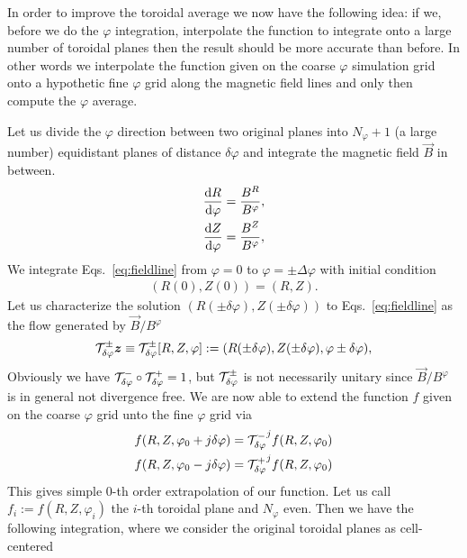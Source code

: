In order to improve the toroidal average we now have the following idea:
if we, before we do the $\varphi$ integration,
interpolate the function to integrate onto a large number of toroidal
planes then the result should
be more accurate than before.
In other words we interpolate the function given on the coarse $\varphi$ simulation grid
onto a hypothetic fine $\varphi$ grid along the magnetic field lines
and only then compute the $\varphi$ average.

Let us divide the $\varphi$ direction between two original planes into $N_\varphi+1$ (a large number) equidistant planes
of distance $\delta \varphi$ and integrate the magnetic field $\vec B$ in between.
\begin{subequations}
\begin{align}
    \frac{\d R}{\d\varphi}&= \frac{B^R}{B^\varphi},\\ %
    \frac{\d Z}{\d\varphi}&=\frac{B^Z}{B^\varphi},\\%
\end{align}
\label{eq:fieldline}
\end{subequations}
We integrate Eqs.~\eqref{eq:fieldline} from $\varphi=0$ to $\varphi=\pm \Delta \varphi$
with initial condition
\begin{align}
    (R(0), Z(0) ) = (R, Z).
    \label{}
\end{align}
Let us characterize the solution $(R(\pm \delta \varphi), Z(\pm \delta \varphi))$ to Eqs.~\eqref{eq:fieldline} as the flow generated by $\vec B/B^\varphi$
\begin{align}
    \mathcal T^\pm_{\delta\varphi}{\boldsymbol{z}} \equiv \mathcal T^\pm_{\delta\varphi}[R, Z, \varphi]:= ( R(\pm \delta\varphi), Z( \pm \delta\varphi), \varphi\pm\delta \varphi),
    \label{}
\end{align}
Obviously we have $\mathcal T^-_{\delta\varphi}\circ\mathcal T^+_{\delta\varphi} = 1$, but $\mathcal T^\pm_{\delta\varphi}$ is not necessarily unitary since $\vec B/B^\varphi$ is in general
not divergence free.
We are now able to extend the function $f$ given on the coarse $\varphi$ grid unto the fine $\varphi$ grid via
\begin{align}
    f(R,Z,\varphi_0+j\delta\varphi) = {\mathcal T^-_{\delta\varphi}}^j f(R,Z,\varphi_0)\\
    f(R,Z,\varphi_0-j\delta \varphi) = {\mathcal T^+_{\delta\varphi}}^j f(R,Z,\varphi_0)
\end{align}
This gives simple 0-th order extrapolation of our function.
Let us call $f_i := f(R,Z,\varphi_i)$ the $i$-th toroidal plane and $N_\varphi$ even. Then
we have the following integration, where we consider the original toroidal planes as cell-centered

